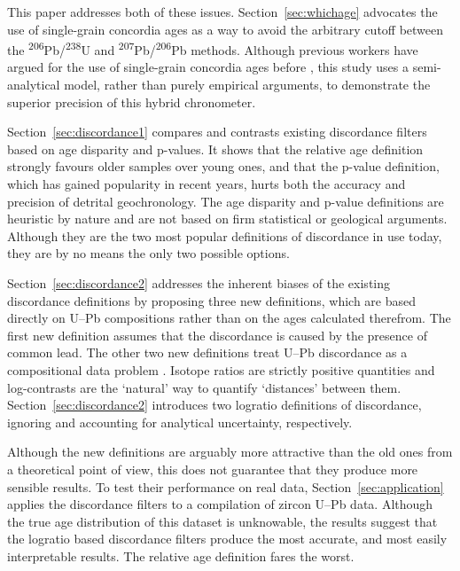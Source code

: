 \documentclass{article}
\begin{document}
This paper addresses both of these issues. Section~\ref{sec:whichage}
advocates the use of single-grain concordia ages \citep{ludwig1998} as
a way to avoid the arbitrary cutoff between the
\textsuperscript{206}Pb/\textsuperscript{238}U and
\textsuperscript{207}Pb/\textsuperscript{206}Pb methods. Although
previous workers have argued for the use of single-grain concordia
ages before \citep[see][for a recent example]{zimmermann2018}, this
study uses a semi-analytical model, rather than purely empirical
arguments, to demonstrate the superior precision of this hybrid
chronometer.

Section~\ref{sec:discordance1} compares and contrasts existing
discordance filters based on age disparity and p-values. It shows that
the relative age definition strongly favours older samples over young
ones, and that the p-value definition, which has gained popularity in
recent years, hurts both the accuracy and precision of detrital
geochronology. The age disparity and p-value definitions are heuristic
by nature and are not based on firm statistical or geological
arguments.  Although they are the two most popular definitions of
discordance in use today, they are by no means the only two possible
options.

Section~\ref{sec:discordance2} addresses the inherent biases of the
existing discordance definitions by proposing three new definitions,
which are based directly on U--Pb compositions rather than on the ages
calculated therefrom. The first new definition assumes that the
discordance is caused by the presence of common lead. The other two
new definitions treat U--Pb discordance as a compositional data
problem \citep[\textit{sensu}][]{aitchison1986}.  Isotope ratios are
strictly positive quantities and log-contrasts are the `natural' way
to quantify `distances' between them.  Section~\ref{sec:discordance2}
introduces two logratio definitions of discordance, ignoring and
accounting for analytical uncertainty, respectively.

Although the new definitions are arguably more attractive than the old
ones from a theoretical point of view, this does not guarantee that
they produce more sensible results. To test their performance on real
data, Section~\ref{sec:application} applies the discordance filters to
a compilation of zircon U--Pb data. Although the true age distribution
of this dataset is unknowable, the results suggest that the logratio
based discordance filters produce the most accurate, and most easily
interpretable results. The relative age definition fares the worst.
\end{document}
